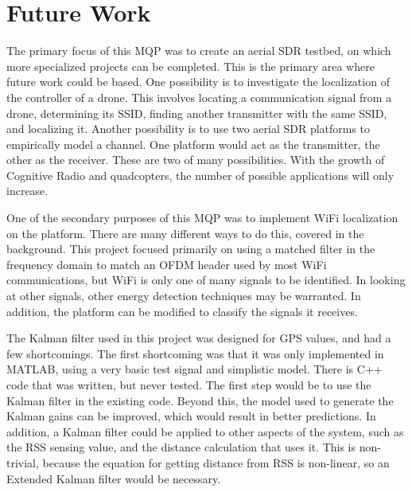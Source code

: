 \section{Future Work}
The primary focus of this MQP was to create an aerial SDR testbed, on which more 
specialized projects can be completed. This is the primary area where future work
could be based. One possibility is to investigate the localization of the controller
of a drone. This involves locating a communication signal from a drone, determining its
SSID, finding another transmitter with the same SSID, and localizing it. Another possibility
is to use two aerial SDR platforms to empirically model a channel. One platform
would act as the transmitter, the other as the receiver. These are two of many possibilities.
With the growth of Cognitive Radio and quadcopters, the number of possible applications
will only increase.\par

One of the secondary purposes of this MQP was to implement WiFi localization on 
the platform. There are many different ways to do this, covered in the background.
This project focused primarily on using a matched filter in the frequency domain to match
an OFDM header used by most WiFi communications, but WiFi is only one of many 
signals to be identified. In looking at other signals, other energy detection
techniques may be warranted. In addition, the platform can be modified to 
classify the signals it receives.\par

The Kalman filter used in this project was designed for GPS values, and had a few shortcomings.
The first shortcoming was that it was only implemented in MATLAB, using a very basic
test signal and simplistic model. There is C++ code that was written, but never tested.
The first step would be to use the Kalman filter in the existing code. Beyond this,
the model used to generate the Kalman gains can be improved, which would result in better 
predictions. In addition, a Kalman filter could be applied to other aspects of the 
system, such as the RSS sensing value, and the distance calculation that uses it.
This is non-trivial, because the equation for getting distance from RSS is non-linear,
so an Extended Kalman filter would be necessary. 
